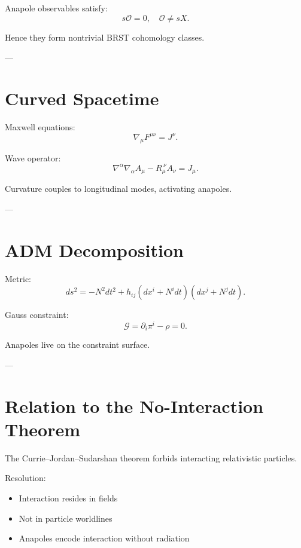 \documentclass[11pt]{article}
\begin{document}
Anapole observables satisfy:
\begin{equation}
s\mathcal{O} = 0, \quad \mathcal{O} \neq sX.
\end{equation}

Hence they form nontrivial BRST cohomology classes.

---

\section{Curved Spacetime}

Maxwell equations:
\begin{equation}
\nabla_\mu F^{\mu\nu} = J^\nu.
\end{equation}

Wave operator:
\begin{equation}
\nabla^\alpha\nabla_\alpha A_\mu - R_\mu^{\ \nu}A_\nu = J_\mu.
\end{equation}

Curvature couples to longitudinal modes, activating anapoles.

---

\section{ADM Decomposition}

Metric:
\begin{equation}
ds^2 = -N^2 dt^2 + h_{ij}(dx^i + N^i dt)(dx^j + N^j dt).
\end{equation}

Gauss constraint:
\begin{equation}
\mathcal{G} = \partial_i \pi^i - \rho = 0.
\end{equation}

Anapoles live on the constraint surface.

---

\section{Relation to the No-Interaction Theorem}

The Currie–Jordan–Sudarshan theorem forbids interacting relativistic particles.

Resolution:
\begin{itemize}
\item Interaction resides in fields
\item Not in particle worldlines
\item Anapoles encode interaction without radiation
\end{itemize}
\end{document}
